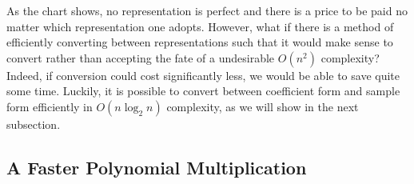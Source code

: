 \documentclass[12pt]{article}
\begin{document}
As the chart shows, no representation is perfect and there is a price to be paid no matter which representation one adopts. However, what if there is a method of efficiently converting between representations such that it would make sense to convert rather than accepting the fate of a undesirable $O(n^2)$ complexity? Indeed, if conversion could cost significantly less, we would be able to save quite some time. Luckily, it is possible to convert between coefficient form and sample form efficiently in $O(n\log_2{n})$ complexity, as we will show in the next subsection.

\subsection{A Faster Polynomial Multiplication}
\end{document}
